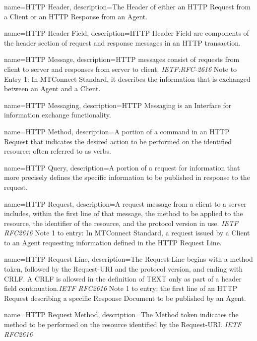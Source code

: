 {
    name={HTTP Header},
	description={The \gls{Header} of either an \gls{HTTP Request} from a \gls{Client} or an \gls{HTTP Response} from an \gls{Agent}.}
}

{
    name={HTTP Header Field},
	description={\gls{HTTP Header Field} are components of the header section of request and response messages in an HTTP transaction.}
}

{
    name={HTTP Message},
	description={HTTP messages consist of requests from client to server and responses from server to client. \textit{IETF:RFC-2616}
Note to Entry 1: In MTConnect Standard, it describes the information that is exchanged between an \gls{Agent} and a \gls{Client}.}
}

{
    name={HTTP Messaging},
	description={\gls{HTTP Messaging} is an \gls{Interface} for information exchange functionality.}
}

{
    name={HTTP Method},
	description={A portion of a command in an \gls{HTTP Request} that indicates the desired action to be performed on the identified resource; often referred to as verbs.
}
}

{
    name={HTTP Query},
	description={A portion of a request for information that more precisely defines the specific information to be published in response to the request. }
}

{
    name={HTTP Request},
	description={A request message from a client to a server includes, within the first line of that message, the method to be applied to the resource, the identifier of the resource, and the protocol version in use. \textit{IETF RFC2616}
Note 1 to entry: In MTConnect Standard, a request issued by a \gls{Client} to an \gls{Agent} requesting information defined in the \gls{HTTP Request Line}.}
}

{
    name={HTTP Request Line},
	description={The Request-Line begins with a method token, followed by the Request-URI and the protocol version, and ending with CRLF. A CRLF is allowed in the definition of TEXT only as part of a header field continuation.\textit{IETF RFC2616}
Note 1 to entry: the first line of an \gls{HTTP Request} describing a specific \gls{Response Document} to be published by an \gls{Agent}.}
}

{
    name={HTTP Request Method},
	description={The Method  token indicates the method to be performed on the resource identified by the Request-URI. \textit{IETF RFC2616}}
}

